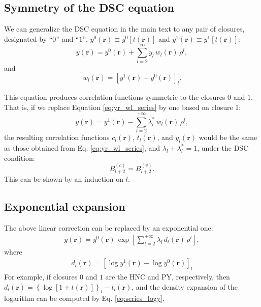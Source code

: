 \documentclass[aip,jcp,preprint,superscriptaddress,showpacs,preprintnumbers,amsmath,amssymb]{revtex4-1}
\numberwithin{equation}{section}
\newcommand{\vct}[1]{\mathbf{#1}}
\providecommand{\vr}{} %
\renewcommand{\vr}{\vct{r}}
\begin{document}
\subsection{Symmetry of the DSC equation}





We can generalize the DSC equation in the main text
to any pair of closures,
designated by ``$0$'' and ``$1$'',
$y^0(\vr) \equiv y^0[t(\vr)]$
and
$y^1(\vr) \equiv y^1[t(\vr)]$:
%
%
%
\begin{equation}
y(\vr)
=
y^0(\vr)
+
\sum_{l = 2}^{\infty}
y_l \, w_l(\vr) \, \rho^l,
\label{eq:yr_wl_series}
\end{equation}
%
%
%
and
%
%
%
\begin{equation}
w_l(\vr)
=
\left[
y^1(\vr) - y^0(\vr)
\right]_l.
\label{eq:wl_y1_y0}
\end{equation}



This equation
produces correlation functions symmetric
to the closures $0$ and $1$.
%
That is, if we replace
Equation \eqref{eq:yr_wl_series}
by one based on closure $1$:
%
%
%
\[
y(\vr)
=
y^1(\vr)
-
\sum_{l = 2}^{+\infty}
\lambda_l^* \, w_l(\vr) \, \rho^l,
\]
%
%
%
the resulting correlation functions
$c_l(\vr)$, $t_l(\vr)$, and $y_l(\vr)$
would be the same as those obtained from
Eq. \eqref{eq:yr_wl_series},
and $\lambda_l + \lambda_l^* = 1$,
under the DSC condition:
%
%
%
\begin{equation}
B_{l+2}^{(c)}
=
B_{l+2}^{(v)}.
\label{eq:Bc_eq_Bv}
\end{equation}
%
%
%
This can be shown by an induction on $l$.





\subsection{Exponential expansion}





The above linear correction can be replaced
by an exponential one:
%
\begin{align*}
y(\vr)
=
y^0(\vr) \,
\exp\left[
\sum_{l = 2}^{+\infty} \lambda_l \, d_l(\vr) \, \rho^l
\right],
\end{align*}
%
where
%
\begin{align*}
d_l(\vr)
=
\left[
  \log y^1(\vr)
  -
  \log y^0(\vr)
\right]_l
\end{align*}
%
For example,
if closures $0$ and $1$ are the HNC and PY, respectively,
then
%
$d_l(\vr) =
\left\{
  \log \left[ 1 + t(\vr) \right]
\right\}_l - t_l(\vr)$,
%
and the density expansion of the logarithm
can be computed by Eq. \eqref{eq:series_logy}.
\end{document}
